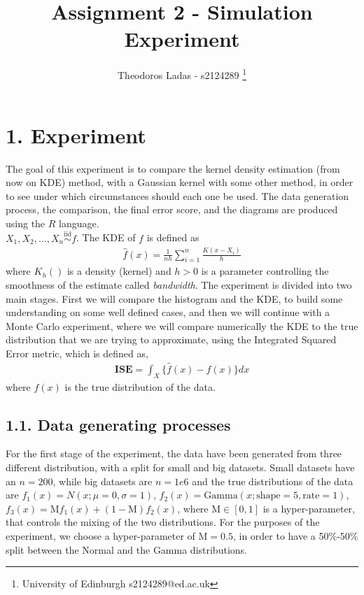 \documentclass[fleqn, a4paper]{report}
\title{Assignment 2 - Simulation Experiment}
\author{
Theodoros Ladas - s2124289 
\footnote{University of Edinburgh s2124289@ed.ac.uk}
}
\date{\parbox{\linewidth}{\centering%
  February 4, 2021\endgraf\bigskip
  Coordinator: Miguel de Carvalho\endgraf\medskip
  Dept.\ of Mathematics \endgraf
  University of Edinburgh}}
\begin{document}
\maketitle

\section*{1. Experiment}

The goal of this experiment is to compare the kernel density estimation (from now on KDE) method, with a Gaussian kernel with some other method, in order to see under which circumstances should each one be used. The data generation process, the comparison, the final error score, and the diagrams are produced using the $R$ language.
\\
 $X_1,X_2,...,X_n \overset{\text{iid}}{\sim} f$. The KDE of $f$ is defined as
\begin{align*}
\hat{f}(x) = \frac{1}{nh}\sum_{i=1}^n \frac{K(x-X_i)}{h}
\end{align*}
where $K_h()$ is a density (kernel) and $h>0$ is a parameter controlling the smoothness of the estimate called \textit{bandwidth}.
The experiment is divided into two main stages. First we will compare the histogram and the KDE, to build some understanding on some well defined cases, and then we will continue with a Monte Carlo experiment, where we will compare numerically the KDE to the true distribution that we are trying to approximate, using the Integrated Squared Error metric, which is defined as,
\begin{align*}
\textbf{ISE} = \int_X \{\hat{f}(x) - f(x)\}dx
\end{align*}
where $f(x)$ is the true distribution of the data.


\subsection*{1.1. Data generating processes}
For the first stage of the experiment, the data have been generated from three different distribution, with a split for small and big datasets. Small datasets have an $n=200$, while big datasets are $n=1e6$ and the true distributions of the data are $f_1(x) = N(x; \mu=0, \sigma=1)$, $f_2(x) = \text{Gamma}(x; \text{shape}=5, \text{rate}=1)$, 
$f_3(x) = \text{M}f_1(x) + (1-\text{M})f_2(x)$, where $\text{M} \in [0,1]$ is a hyper-parameter, that controls the mixing of the two distributions. For the purposes of the experiment, we choose a hyper-parameter of $\text{M} = 0.5$, in order to have a 50\%-50\% split between the Normal and the Gamma distributions. 
\end{document}
